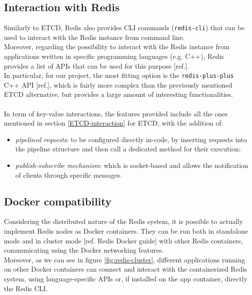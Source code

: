 \subsection{Interaction with Redis}
Similarly to ETCD, Redis also provides CLI commands (\texttt{redis-cli}) that can be used to interact with the Redis instance from command line. \\
Moreover, regarding the possibility to interact with the Redis instance from applications written in specific programming languages (e.g. C++), Redis provides a list of APIs that can be used for this purpose [ref.]. \\
In particular, for our project, the most fitting option is the \texttt{redis-plus-plus} C++ API [ref.], which is fairly more complex than the previously mentioned ETCD alternative, but provides a large amount of interesting functionalities. \\ \\
In term of key-value interactions, the features provided include all the ones mentioned in section \ref{ETCD-interaction} for ETCD, with the addition of:
\begin{itemize}
	\item \textit{pipelined requests}: to be configured directly in-code, by inserting requests into the pipeline structure and then call a dedicated method for their execution;
	\item \textit{publish-subscribe mechanism}: which is socket-based and allows the notification of clients through specific messages.
\end{itemize}

\subsection{Docker compatibility}
Considering the distributed nature of the Redis system, it is possible to actually implement Redis nodes as Docker containers. They can be run both in standalone mode and in cluster mode [ref. Redis Docker guide] with other Redis containers, communicating using the Docker networking features. \\
Moreover, as we can see in figure \ref{fig:redis-cluster}, different applications running on other Docker containers can connect and interact with the containerized Redis system, using language-specific APIs or, if installed on the app container, directly the Redis CLI.



